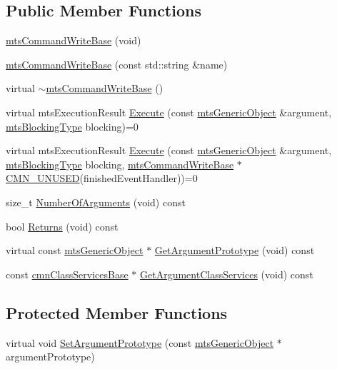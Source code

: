 \subsection*{Public Member Functions}
\begin{DoxyCompactItemize}
\item 
\hyperlink{classmts_command_write_base_a6f4d5fca6143636b3f0b55c99e1807fb}{mts\+Command\+Write\+Base} (void)
\item 
\hyperlink{classmts_command_write_base_a5a7579b6022d48ba89fff9d4a757258e}{mts\+Command\+Write\+Base} (const std\+::string \&name)
\item 
virtual \hyperlink{classmts_command_write_base_afc6522de71949aa9a17fbbfed1b739a8}{$\sim$mts\+Command\+Write\+Base} ()
\item 
virtual mts\+Execution\+Result \hyperlink{classmts_command_write_base_ae0f9db1cdc228fe67c59b86994d28115}{Execute} (const \hyperlink{classmts_generic_object}{mts\+Generic\+Object} \&argument, \hyperlink{mts_forward_declarations_8h_ad7426ccb6c883bc780d0ee197dddcbe7}{mts\+Blocking\+Type} blocking)=0
\item 
virtual mts\+Execution\+Result \hyperlink{classmts_command_write_base_a2bf3f188291d690478be5452ba5ba42d}{Execute} (const \hyperlink{classmts_generic_object}{mts\+Generic\+Object} \&argument, \hyperlink{mts_forward_declarations_8h_ad7426ccb6c883bc780d0ee197dddcbe7}{mts\+Blocking\+Type} blocking, \hyperlink{classmts_command_write_base}{mts\+Command\+Write\+Base} $\ast$\hyperlink{cmn_portability_8h_a021894e2626935fa2305434b1e893ff6}{C\+M\+N\+\_\+\+U\+N\+U\+S\+E\+D}(finished\+Event\+Handler))=0
\item 
size\+\_\+t \hyperlink{classmts_command_write_base_a0654ecf1e52106edaa961f4dd9ad8272}{Number\+Of\+Arguments} (void) const 
\item 
bool \hyperlink{classmts_command_write_base_a69c98178df30cf4b2c3bd808c3616402}{Returns} (void) const 
\item 
virtual const \hyperlink{classmts_generic_object}{mts\+Generic\+Object} $\ast$ \hyperlink{classmts_command_write_base_aeb23012177ead24850c6d2f5f9d76015}{Get\+Argument\+Prototype} (void) const 
\item 
const \hyperlink{classcmn_class_services_base}{cmn\+Class\+Services\+Base} $\ast$ \hyperlink{classmts_command_write_base_a95228eaf116fb4f55922f21ad47ea3a6}{Get\+Argument\+Class\+Services} (void) const 
\end{DoxyCompactItemize}
\subsection*{Protected Member Functions}
\begin{DoxyCompactItemize}
\item 
virtual void \hyperlink{classmts_command_write_base_a1b369a356b5c2fb8ed3f5a72c3c521d1}{Set\+Argument\+Prototype} (const \hyperlink{classmts_generic_object}{mts\+Generic\+Object} $\ast$argument\+Prototype)
\end{DoxyCompactItemize}
